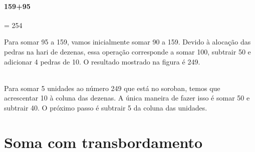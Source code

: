 \documentclass[12pt]{book}
\begin{document}
\vspace{0.8cm}
\paragraph{159+95}= 254\\

\begin{minipage}{0.4\textwidth}
\end{minipage}%
%
\begin{minipage}{0.5\textwidth}
  Para somar 95 a 159, vamos
  inicialmente somar 90 a 159.
  Devido à alocação das pedras na
  hari de dezenas, essa operação
  corresponde a somar 100,
  subtrair 50 e adicionar 4
  pedras de 10. O resultado mostrado
  na figura é 249.
\end{minipage}


\begin{minipage}{0.4\textwidth}
\end{minipage}%
%
\begin{minipage}{0.5\textwidth}
\verb||\\
  Para somar 5 unidades ao número
  249 que está no soroban, temos
  que acrescentar 10 à coluna das
  dezenas. A única maneira de
  fazer isso é somar 50 e subtrair
  40. O próximo passo é subtrair
  5 da coluna das unidades.
\end{minipage}

\section{Soma com transbordamento}
\end{document}
